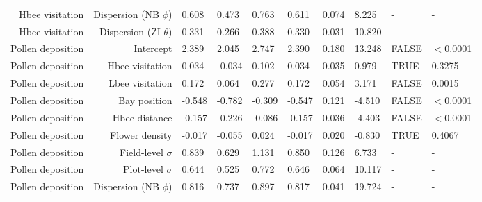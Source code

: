 \begin{landscape}
\begin{longtable}{|r|r|l|l|l|l|l|l|l|l|}
    Hbee visitation & Dispersion (NB $\phi$) & 0.608 & 0.473 & 0.763 & 0.611 & 0.074 & 8.225 &  - & -  \\ 
    Hbee visitation & Dispersion (ZI $\theta$) & 0.331 & 0.266 & 0.388 & 0.330 & 0.031 & 10.820 &  - & -  \\ 
    \hline
    Pollen deposition & Intercept & 2.389 & 2.045 & 2.747 & 2.390 & 0.180 & 13.248 & FALSE & $<$0.0001 \\ 
    Pollen deposition & Hbee visitation & 0.034 & -0.034 & 0.102 & 0.034 & 0.035 & 0.979 & TRUE & 0.3275 \\ 
    Pollen deposition & Lbee visitation & 0.172 & 0.064 & 0.277 & 0.172 & 0.054 & 3.171 & FALSE & 0.0015 \\ 
    Pollen deposition & Bay position & -0.548 & -0.782 & -0.309 & -0.547 & 0.121 & -4.510 & FALSE & $<$0.0001 \\ 
    Pollen deposition & Hbee distance & -0.157 & -0.226 & -0.086 & -0.157 & 0.036 & -4.403 & FALSE & $<$0.0001 \\ 
    Pollen deposition & Flower density & -0.017 & -0.055 & 0.024 & -0.017 & 0.020 & -0.830 & TRUE & 0.4067 \\ 
    Pollen deposition & Field-level $\sigma$ & 0.839 & 0.629 & 1.131 & 0.850 & 0.126 & 6.733 &  - & -  \\ 
    Pollen deposition & Plot-level $\sigma$ & 0.644 & 0.525 & 0.772 & 0.646 & 0.064 & 10.117 &  - & -  \\ 
    Pollen deposition & Dispersion (NB $\phi$) & 0.816 & 0.737 & 0.897 & 0.817 & 0.041 & 19.724 &  - & -  \\ 
    \hline
    

\end{longtable}
\end{landscape}
